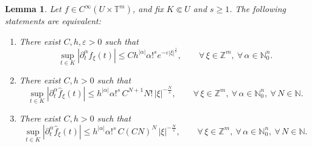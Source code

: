 \documentclass[11pt,reqno]{amsart}
\numberwithin{equation}{section}
\newtheorem{lemma}[theorem]{Lemma}
\begin{document}
	\begin{lemma}\label{lemma_fourier_r}
		Let \(f\in C^\infty(U\times\mathbb{T}^m)\), and fix \(K\Subset U\) and \(s\geq 1\).
		The following statements are equivalent:
		\begin{enumerate}
			\item There exist \(C,h,\varepsilon>0\) such that
			\[
			\sup_{t\in K}|\partial_t^\alpha\widehat{f}_\xi(t)|
			\leq Ch^{|\alpha|}\alpha!^s e^{-\varepsilon|\xi|^{\frac{1}{s}}}, \qquad\forall\, \xi\in\mathbb{Z}^m,\ \forall\, \alpha\in\mathbb{N}_0^n.
			\]
			
			\item There exist \(C,h>0\) such that
			\[
			\sup_{t\in K}|\partial_t^\alpha\widehat{f}_\xi(t)|
			\leq h^{|\alpha|}\alpha!^s\, C^{N+1}N!\,|\xi|^{-\frac{N}{s}}, \qquad\forall\, \xi\in\mathbb{Z}^m,\ \forall\, \alpha\in\mathbb{N}_0^n,\ \forall\, N\in\mathbb{N}.
			\]
			
			
			\item There exist \(C,h>0\) such that
			\[
			\sup_{t\in K}|\partial_t^\alpha\widehat{f}_\xi(t)|
			\leq h^{|\alpha|}\alpha!^s\, C(CN)^N\,|\xi|^{-\frac{N}{s}}, \qquad\forall\, \xi\in\mathbb{Z}^m,\ \forall\, \alpha\in\mathbb{N}_0^n,\ \forall\, N\in\mathbb{N}.
			\]
			
		\end{enumerate}
	\end{lemma}
	
	
\end{document}

